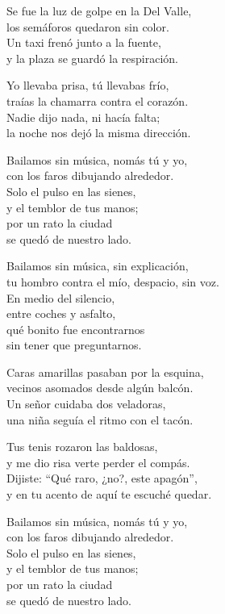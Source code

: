 \begin{lyrics}
Se fue la luz de golpe en la Del Valle,\\
los semáforos quedaron sin color.\\
Un taxi frenó junto a la fuente,\\
y la plaza se guardó la respiración.

Yo llevaba prisa, tú llevabas frío,\\
traías la chamarra contra el corazón.\\
Nadie dijo nada, ni hacía falta;\\
la noche nos dejó la misma dirección.

Bailamos sin música, nomás tú y yo,\\
con los faros dibujando alrededor.\\
Solo el pulso en las sienes,\\
y el temblor de tus manos;\\
por un rato la ciudad\\
se quedó de nuestro lado.

Bailamos sin música, sin explicación,\\
tu hombro contra el mío, despacio, sin voz.\\
En medio del silencio,\\
entre coches y asfalto,\\
qué bonito fue encontrarnos\\
sin tener que preguntarnos.

Caras amarillas pasaban por la esquina,\\
vecinos asomados desde algún balcón.\\
Un señor cuidaba dos veladoras,\\
una niña seguía el ritmo con el tacón.

Tus tenis rozaron las baldosas,\\
y me dio risa verte perder el compás.\\
Dijiste: “Qué raro, ¿no?, este apagón”,\\
y en tu acento de aquí te escuché quedar.

Bailamos sin música, nomás tú y yo,\\
con los faros dibujando alrededor.\\
Solo el pulso en las sienes,\\
y el temblor de tus manos;\\
por un rato la ciudad\\
se quedó de nuestro lado.


\end{lyrics}
